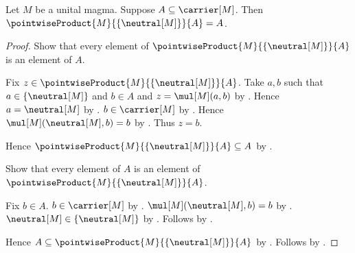 \begin{proposition}\label{pointwise_product_neutral_singleton_left}
    Let $M$ be a unital magma.
    Suppose $A\subseteq\carrier[M]$.
    Then $\pointwiseProduct{M}{\{\neutral[M]\}}{A}=A$.
\end{proposition}
\begin{proof}
    Show that every element of
        $\pointwiseProduct{M}{\{\neutral[M]\}}{A}$ is an element of $A$.
    \begin{subproof}
        Fix $z\in\pointwiseProduct{M}{\{\neutral[M]\}}{A}$.
        Take $a,b$ such that $a\in\{\neutral[M]\}$ and $b\in A$ and
            $z=\mul[M](a,b)$ by .
        Hence $a=\neutral[M]$ by .
        $b\in\carrier[M]$ by .
        Hence $\mul[M](\neutral[M],b)=b$ by
            .
        Thus $z=b$.
    \end{subproof}
    Hence $\pointwiseProduct{M}{\{\neutral[M]\}}{A}\subseteq A$ by
        .

    Show that every element of $A$ is an element of
        $\pointwiseProduct{M}{\{\neutral[M]\}}{A}$.
    \begin{subproof}
        Fix $b\in A$.
        $b\in\carrier[M]$ by .
        $\mul[M](\neutral[M],b)=b$ by .
        $\neutral[M]\in\{\neutral[M]\}$ by .
        Follows by .
    \end{subproof}
    Hence $A\subseteq\pointwiseProduct{M}{\{\neutral[M]\}}{A}$ by
        .
    Follows by .
\end{proof}

